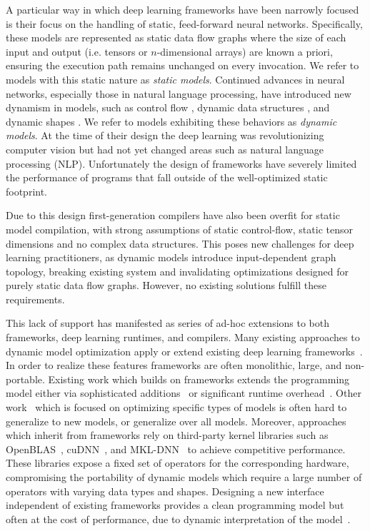 A particular way in which deep learning frameworks have been narrowly focused
  is their focus on the handling of static, feed-forward neural networks.
Specifically, these models are represented as static data flow graphs where the
  size of each input and output (i.e. tensors or $n$-dimensional arrays) are known a priori,
  ensuring the execution path remains unchanged on every invocation.
We refer to models with this static nature as \emph{static models}.
Continued advances in neural networks, especially those in natural language processing,
  have introduced new dynamism in models, such as control flow \citep{lstm, language_model},
  dynamic data structures \citep{tree_lstm, graph_lstm}, and dynamic shapes \citep{devlin2018bert}.
  We refer to models exhibiting these behaviors as {\em dynamic models}.
At the time of their design the deep learning was revolutionizing
  computer vision but had not yet changed areas such as natural language processing (NLP).
Unfortunately the design of frameworks have severely limited the performance
  of programs that fall outside of the well-optimized static footprint.

Due to this design first-generation compilers have also been overfit
  for static model compilation, with strong assumptions of static control-flow,
  static tensor dimensions and no complex data structures.
This poses new challenges for deep learning practitioners, as dynamic models introduce
  input-dependent graph topology, breaking existing system and invalidating optimizations
  designed for purely static data flow graphs.
However, no existing solutions fulfill these requirements.

This lack of support has manifested as series of ad-hoc extensions to
  both frameworks, deep learning runtimes, and compilers.
Many existing approaches to dynamic model optimization apply or
  extend existing deep learning frameworks~\citep{xu2018cavs, gao2018low, yu2018dynamic, jeong2018improving, jeong2019janus, dynet, tf_fold}.
In order to realize these features frameworks are often monolithic, large, and non-portable.
Existing work which builds on frameworks extends the programming model either via
  sophisticated additions~\citep{yu2018dynamic} or significant runtime overhead~\citep{tf_fold, jeong2019janus}.
Other work~\citep{xu2018cavs, gao2018low, tf_fold} which is focused on optimizing specific types
  of models is often hard to generalize to new models, or generalize over all models.
Moreover, approaches which inherit from frameworks rely on third-party kernel libraries
  such as OpenBLAS~\citep{xianyi2014openblas}, cuDNN~\citep{cudnn}, and MKL-DNN~\citep{mkldnn} to achieve competitive performance.
 These libraries expose a fixed set of operators for the corresponding hardware,
  compromising the portability of dynamic models which require a large number of operators with varying data types and shapes.
Designing a new interface independent of existing frameworks provides a clean programming model
  but often at the cost of performance, due to dynamic interpretation of the model~\citep{dynet}.

